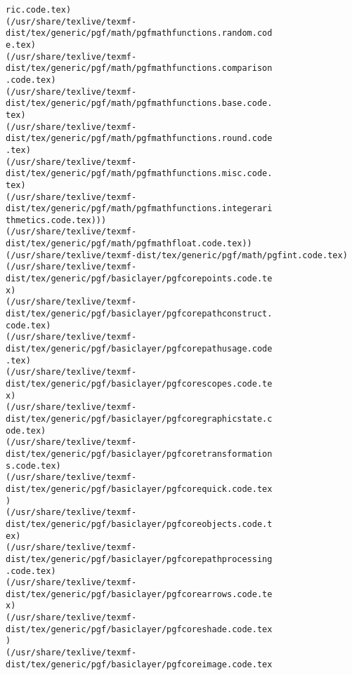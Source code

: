 \documentclass[11pt]{article}
\begin{document}
\begin{Verbatim}[commandchars=\\\{\}]
ric.code.tex)
(/usr/share/texlive/texmf-dist/tex/generic/pgf/math/pgfmathfunctions.random.cod
e.tex)
(/usr/share/texlive/texmf-dist/tex/generic/pgf/math/pgfmathfunctions.comparison
.code.tex)
(/usr/share/texlive/texmf-dist/tex/generic/pgf/math/pgfmathfunctions.base.code.
tex)
(/usr/share/texlive/texmf-dist/tex/generic/pgf/math/pgfmathfunctions.round.code
.tex)
(/usr/share/texlive/texmf-dist/tex/generic/pgf/math/pgfmathfunctions.misc.code.
tex)
(/usr/share/texlive/texmf-dist/tex/generic/pgf/math/pgfmathfunctions.integerari
thmetics.code.tex)))
(/usr/share/texlive/texmf-dist/tex/generic/pgf/math/pgfmathfloat.code.tex))
(/usr/share/texlive/texmf-dist/tex/generic/pgf/math/pgfint.code.tex)
(/usr/share/texlive/texmf-dist/tex/generic/pgf/basiclayer/pgfcorepoints.code.te
x)
(/usr/share/texlive/texmf-dist/tex/generic/pgf/basiclayer/pgfcorepathconstruct.
code.tex)
(/usr/share/texlive/texmf-dist/tex/generic/pgf/basiclayer/pgfcorepathusage.code
.tex)
(/usr/share/texlive/texmf-dist/tex/generic/pgf/basiclayer/pgfcorescopes.code.te
x)
(/usr/share/texlive/texmf-dist/tex/generic/pgf/basiclayer/pgfcoregraphicstate.c
ode.tex)
(/usr/share/texlive/texmf-dist/tex/generic/pgf/basiclayer/pgfcoretransformation
s.code.tex)
(/usr/share/texlive/texmf-dist/tex/generic/pgf/basiclayer/pgfcorequick.code.tex
)
(/usr/share/texlive/texmf-dist/tex/generic/pgf/basiclayer/pgfcoreobjects.code.t
ex)
(/usr/share/texlive/texmf-dist/tex/generic/pgf/basiclayer/pgfcorepathprocessing
.code.tex)
(/usr/share/texlive/texmf-dist/tex/generic/pgf/basiclayer/pgfcorearrows.code.te
x)
(/usr/share/texlive/texmf-dist/tex/generic/pgf/basiclayer/pgfcoreshade.code.tex
)
(/usr/share/texlive/texmf-dist/tex/generic/pgf/basiclayer/pgfcoreimage.code.tex


\end{Verbatim}
\end{document}
